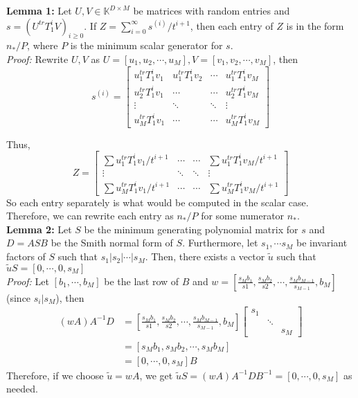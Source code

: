 \documentclass[12pt]{article}
\begin{document}
\noindent\textbf{Lemma 1:} Let $U,V \in \mathbb{K}^{D\times M}$
be matrices with random entries and $s = (U^{tr}T_1^iV)_{i \ge 0}$. If 
$Z = \sum_{i = 0}^{\infty} s^{(i)}/ t^{i+1}$, then each entry of $Z$ is
in the form $n_*/P$, where $P$ is the minimum scalar generator for
$s$.\\

\noindent\textit{Proof:} Rewrite $U,V$ as 
$U = [u_1,u_2,\cdots,u_M], V= [v_1,v_2,\cdots,v_M]$, then 
$$s^{(i)} = 
\begin{bmatrix}
u_1^{tr}T_1^iv_1 & u_1^{tr}T_1^iv_2 & \cdots   & u_1^{tr}T_1^iv_M \\
u_2^{tr}T_1^iv_1 & \cdots           & \cdots   & u_2^{tr}T_1^iv_M \\
\vdots           & \ddots           & \ddots   & \vdots \\
u_M^{tr}T_1^iv_1 & \cdots           & \cdots   & u_M^{tr}T_1^iv_M
\end{bmatrix}$$

Thus, 	
$$ Z = 
\begin{bmatrix}
\sum u_1^{tr}T_1^iv_1/t^{i+1} & \cdots  & \cdots & \sum u_1^{tr}T_1^iv_M/t^{i+1} \\
\vdots                        & \ddots  & \ddots & \vdots \\
\sum u_M^{tr}T_1^iv_1/t^{i+1} & \cdots  & \cdots & \sum u_M^{tr}T_1^iv_M/t^{i+1}
\end{bmatrix}$$
So each entry separately is what would be computed in the scalar case. Therefore,
we can rewrite each entry as $n_*/P$ for some numerator $n_*$.\\

\noindent\textbf{Lemma 2:} Let $S$ be the minimum generating polynomial matrix for $s$
and $D = ASB$ be the Smith normal form of $S$. Furthermore, let $s_1, \cdots s_M$ be
invariant factors of $S$ such that $s_1 | s_2 | \cdots | s_M$. Then, there exists a vector $\tilde{u}$
such that $\tilde{u} S = [0, \cdots, 0, s_M]$\\

\noindent\textit{Proof:} Let $[b_1,\cdots,b_M]$ be the last row of $B$ and 
$w = [\frac{s_Mb_1}{s1},\frac{s_Mb_2}{s2},\cdots,\frac{s_Mb_{M-1}}{s_{M-1}},b_M]$ (since $s_i | s_M$), then
\begin{align*}
	(w A) A^{-1} D &=  [\frac{s_Mb_1}{s1},\frac{s_Mb_2}{s2},\cdots,\frac{s_Mb_{M-1}}{s_{M-1}},b_M]
	\begin{bmatrix}
	s_1 &        & \\
	    & \ddots & \\
	    &        & s_M
	\end{bmatrix}\\
	    &= [s_Mb_1, s_Mb_2, \cdots, s_Mb_M]\\
	    &= [0,\cdots,0,s_M] B
\end{align*}
Therefore, if we choose $\tilde{u} = w A$, we get
$ \tilde{u} S = (w A) A^{-1} D B^{-1} = [0,\cdots,0,s_M]$ as needed.\\
\end{document}
